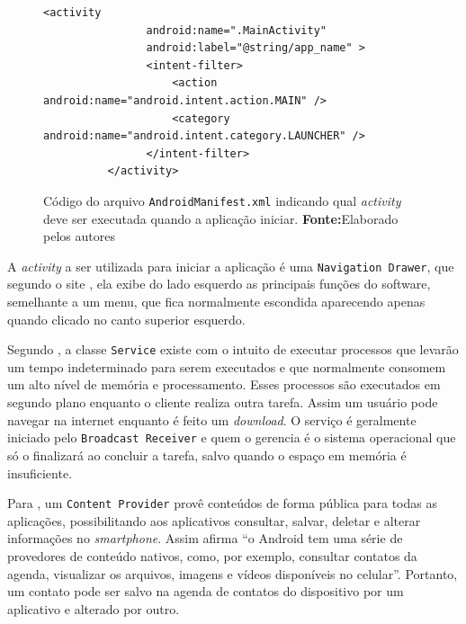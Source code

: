 	\begin{figure}[h!]
		\begin{lstlisting}[style=custom_XML]
		  <activity
	            android:name=".MainActivity"
	            android:label="@string/app_name" >
	            <intent-filter>
	                <action android:name="android.intent.action.MAIN" />
	                <category android:name="android.intent.category.LAUNCHER" />
	            </intent-filter>
	      </activity>
		\end{lstlisting}
		\caption[Código do arquivo
		AndroidManifest.xml indicando qual activity deve ser executada quando a
		aplicação iniciar]{Código do arquivo \texttt{AndroidManifest.xml} indicando
		qual \textit{activity} deve ser executada quando a aplicação iniciar.
		 \textbf{Fonte:}Elaborado pelos autores}
		\label{fig:qt2}
	\end{figure}
	
	\par A \textit{activity} a ser utilizada para iniciar a aplicação é uma
\texttt{Navigation Drawer}, que segundo o site , ela exibe
do lado esquerdo as principais funções do software, semelhante a um
menu, que fica normalmente escondida aparecendo apenas quando clicado no canto
superior esquerdo. 

	\par Segundo , a classe \texttt{Service} existe com o intuito
de executar processos que levarão um tempo indeterminado para serem executados
e que normalmente consomem um alto nível de memória e processamento. Esses
processos são executados em segundo plano enquanto o cliente realiza outra
tarefa. Assim um usuário pode navegar na internet enquanto é feito um
\textit{download}. O serviço é geralmente iniciado pelo \texttt{Broadcast Receiver} e
quem o gerencia é o sistema operacional que só o finalizará ao concluir a
tarefa, salvo quando o espaço em memória é insuficiente.

	\par Para , um \texttt{Content Provider} provê conteúdos de
forma pública para todas as aplicações, possibilitando aos aplicativos consultar,
salvar, deletar e alterar informações no \textit{smartphone}. Assim afirma
 “o Android tem uma série de provedores de
conteúdo nativos, como, por exemplo, consultar contatos da agenda, visualizar
os arquivos, imagens e vídeos disponíveis no celular”. Portanto, um contato
pode ser salvo na agenda de contatos do dispositivo por um aplicativo e
alterado por outro.

